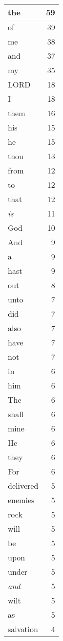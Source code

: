 \begin{center}
\begin{longtable}{l|r}
\hline \hline
\endlastfoot
the & 59 \\ \hline
of & 39 \\ \hline
me & 38 \\ \hline
and & 37 \\ \hline
my & 35 \\ \hline
LORD & 18 \\ \hline
I & 18 \\ \hline
them & 16 \\ \hline
his & 15 \\ \hline
he & 15 \\ \hline
thou & 13 \\ \hline
from & 12 \\ \hline
to & 12 \\ \hline
that & 12 \\ \hline
\emph{is} & 11 \\ \hline
God & 10 \\ \hline
And & 9 \\ \hline
a & 9 \\ \hline
hast & 9 \\ \hline
out & 8 \\ \hline
unto & 7 \\ \hline
did & 7 \\ \hline
also & 7 \\ \hline
have & 7 \\ \hline
not & 7 \\ \hline
in & 6 \\ \hline
him & 6 \\ \hline
The & 6 \\ \hline
shall & 6 \\ \hline
mine & 6 \\ \hline
He & 6 \\ \hline
they & 6 \\ \hline
For & 6 \\ \hline
delivered & 5 \\ \hline
enemies & 5 \\ \hline
rock & 5 \\ \hline
will & 5 \\ \hline
be & 5 \\ \hline
upon & 5 \\ \hline
under & 5 \\ \hline
\emph{and} & 5 \\ \hline
wilt & 5 \\ \hline
as & 5 \\ \hline
salvation & 4 \\ \hline

\end{longtable}
\end{center}
